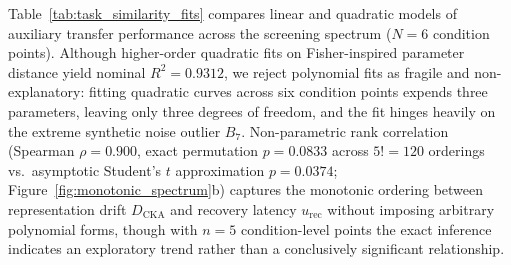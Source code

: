 \documentclass[sn-mathphys,Numbered]{sn-jnl}
\newcommand{\Dcka}{D_{\mathrm{CKA}}}
\newcommand{\urec}{u_{\mathrm{rec}}}
\begin{document}
\begin{appendices}
Table~\ref{tab:task_similarity_fits} compares linear and quadratic models of auxiliary transfer performance across the screening spectrum ($N = 6$ condition points). Although higher-order quadratic fits on Fisher-inspired parameter distance yield nominal $R^2 = 0.9312$, we reject polynomial fits as fragile and non-explanatory: fitting quadratic curves across six condition points expends three parameters, leaving only three degrees of freedom, and the fit hinges heavily on the extreme synthetic noise outlier $B_7$. Non-parametric rank correlation (Spearman $\rho = 0.900$, exact permutation $p = 0.0833$ across $5! = 120$ orderings vs.\ asymptotic Student's $t$ approximation $p = 0.0374$; Figure~\ref{fig:monotonic_spectrum}b) captures the monotonic ordering between representation drift $\Dcka$ and recovery latency $\urec$ without imposing arbitrary polynomial forms, though with $n = 5$ condition-level points the exact inference indicates an exploratory trend rather than a conclusively significant relationship.

\begin{table}[t]
\caption{Goodness-of-fit comparison for predictive models of auxiliary transfer performance across the screening spectrum. Lower AIC and BIC indicate superior model quality.}\label{tab:task_similarity_fits}
\centering
\renewcommand{\arraystretch}{0.88}
\end{table}


\end{appendices}
\end{document}

